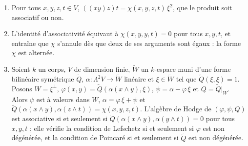 \begin{enonce}\leavevmode
\begin{enumerate}
\item Pour tous $x, y, z, t \in V$, $((xy)z)t = \chi(x,y,z,t)\,\xi^2$, que le produit soit associatif ou non.
\item L'identité d'associativité équivaut à $\chi(x,y,y,t) = 0$ pour tous $x, y, t$, et entraîne que $\chi$ s'annule dès que deux de ses arguments sont égaux : la forme $\chi$ est alternée.
\item Soient $k$ un corps, $V$ de dimension finie, $\tilde W$ un $k$-espace muni d'une forme bilinéaire symétrique $\tilde Q$, $\alpha \colon \Lambda^2 V \to \tilde W$ linéaire et $\xi \in \tilde W$ tel que $\tilde Q(\xi,\xi) = 1$. Posons $W = \xi^{\perp}$, $\varphi(x,y) = \tilde Q(\alpha(x \wedge y), \xi)$, $\psi = \alpha - \varphi\,\xi$ et $Q = \tilde Q|_W$. Alors $\psi$ est à valeurs dans $W$, $\alpha = \varphi\,\xi + \psi$ et $\tilde Q(\alpha(x \wedge y), \alpha(z \wedge t)) = \chi(x,y,z,t)$. L'algèbre de Hodge de $(\varphi, \psi, Q)$ est associative si et seulement si $\tilde Q(\alpha(x \wedge y), \alpha(y \wedge t)) = 0$ pour tous $x, y, t$ ; elle vérifie la condition de Lefschetz si et seulement si $\varphi$ est non dégénérée, et la condition de Poincaré si et seulement si $\tilde Q$ est non dégénérée.
\end{enumerate}
\end{enonce}

